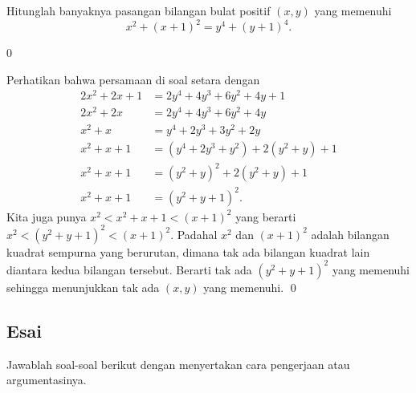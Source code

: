 \documentclass[11pt]{scrartcl}
\begin{document}
	\begin{soalbaru}
		Hitunglah banyaknya pasangan bilangan bulat positif $(x,y)$ yang memenuhi\\[-20pt] $$x^2+(x+1)^2=y^4+(y+1)^4.$$
		
		\begin{jawaban}
		0
		\end{jawaban}
		\begin{solusi}
		Perhatikan bahwa persamaan di soal setara dengan
		\begin{align*}
		2x^2+2x+1&=2y^4+4y^3+6y^2+4y+1\\
		2x^2+2x&=2y^4+4y^3+6y^2+4y\\
		x^2+x&=y^4+2y^3+3y^2+2y\\
		x^2+x+1&=(y^4+2y^3+y^2)+2(y^2+y)+1\\
		x^2+x+1&=(y^2+y)^2+2(y^2+y)+1\\
		x^2+x+1&=(y^2+y+1)^2.
		\end{align*}
		Kita juga punya $x^2 < x^2+x+1 < (x+1)^2$ yang berarti $x^2 < (y^2+y+1)^2 < (x+1)^2$. Padahal $x^2$ dan $(x+1)^2$ adalah bilangan kuadrat sempurna yang berurutan, dimana tak ada bilangan kuadrat lain diantara kedua bilangan tersebut. Berarti tak ada $(y^2+y+1)^2$ yang memenuhi sehingga menunjukkan tak ada $(x,y)$ yang memenuhi. \qed
		
		\end{solusi}
	\end{soalbaru}
	\newpage

\subsection{Esai}
Jawablah soal-soal berikut dengan menyertakan cara pengerjaan atau argumentasinya.
	
\end{document}
